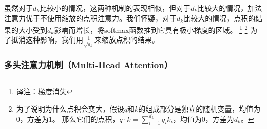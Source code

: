 虽然对于$d_k$比较小的情况，这两种机制的表现相似，但对于$d_k$比较大的情况，加法注意力优于不使用缩放的点积注意力\citep{DBLP:journals/corr/BritzGLL17}。我们怀疑，对于$d_k$比较大的情况，点积的结果的大小受到$d_k$影响而增长，将softmax函数推到它具有极小梯度的区域。
\footnote{译注：梯度消失}
\footnote{为了说明为什么点积会变大，假设$q$和$k$的组成部分是独立的随机变量，均值为$0$，方差为$1$。 那么它们的点积，$q \cdot k = \sum_{i=1}^{d_k} q_ik_i$，均值为$0$，方差为$d_k$。}
为了抵消这种影响，我们用$\frac{1}{\sqrt{d_k}}$来缩放点积的结果。



\subsubsection{多头注意力机制（Multi-Head Attention）} \label{sec:multihead}

